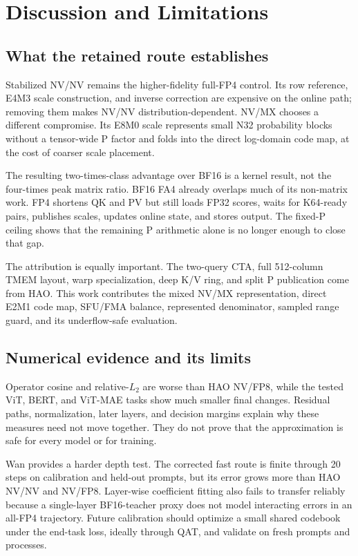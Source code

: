 \section{Discussion and Limitations}

\subsection{What the retained route establishes}

Stabilized NV/NV remains the higher-fidelity full-FP4 control. Its row
reference, E4M3 scale construction, and inverse correction are expensive on
the online path; removing them makes NV/NV distribution-dependent. NV/MX
chooses a different compromise. Its E8M0 scale represents small N32
probability blocks without a tensor-wide P factor and folds into the direct
log-domain code map, at the cost of coarser scale placement.

The resulting two-times-class advantage over BF16 is a kernel result, not the
four-times peak matrix ratio. BF16 FA4 already overlaps much of its non-matrix
work. FP4 shortens QK and PV but still loads FP32 scores, waits for K64-ready
pairs, publishes scales, updates online state, and stores output. The fixed-P
ceiling shows that the remaining P arithmetic alone is no longer enough to
close that gap.

The attribution is equally important. The two-query CTA, full 512-column TMEM
layout, warp specialization, deep K/V ring, and split P publication come from
HAO. This work contributes the mixed NV/MX representation, direct E2M1 code
map, SFU/FMA balance, represented denominator, sampled range guard, and its
underflow-safe evaluation.

\subsection{Numerical evidence and its limits}

Operator cosine and relative-$L_2$ are worse than HAO NV/FP8, while the tested
ViT, BERT, and ViT-MAE tasks show much smaller final changes. Residual paths,
normalization, later layers, and decision margins explain why these measures
need not move together. They do not prove that the approximation is safe for
every model or for training.

Wan provides a harder depth test. The corrected fast route is finite through
20 steps on calibration and held-out prompts, but its error grows more than
HAO NV/NV and NV/FP8. Layer-wise coefficient fitting also fails to transfer
reliably because a single-layer BF16-teacher proxy does not model interacting
errors in an all-FP4 trajectory. Future calibration should optimize a small
shared codebook under the end-task loss, ideally through QAT, and validate on
fresh prompts and processes.

